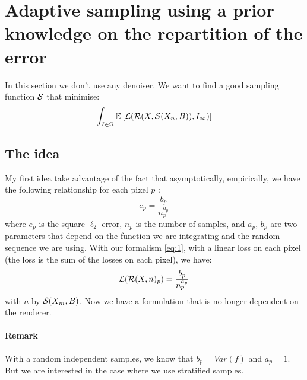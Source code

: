 \documentclass{classeENS}
\begin{document}
\section{Adaptive sampling using a prior knowledge on the repartition of the error}

In this section we don't use any denoiser.
We want to find a good sampling function $\mathcal S$ that minimise:
\[ \int_{I\in\Omega} \mathbb E \left [ \mathcal L (\mathcal R(X, \mathcal S(X_n, B)), I_\infty) \right ] \]

\subsection{The idea}

My first idea take advantage of the fact that asymptotically, empirically, we have 
the following relationship for each pixel $p$ \cite{10.1145/237170.237265}:
\begin{equation}
    \label{eq:99}
    e_p = \frac{b_p}{n_p^{a_p}}
\end{equation}
where $e_p$ is the square $\ell_2$ error, $n_p$ is the number of samples, 
and $a_p$, $b_p$ are two parameters that depend on the function we are 
integrating and the random sequence we are using. With our formalism 
\ref{eq:1}, with a linear loss on each pixel (the loss is the sum of 
the losses on each pixel), we have:
\[ \mathcal L(\mathcal R(X,n)_p) = \frac{b_p}{n_p^{a_p}} \]
with $n$ by $\mathcal S(X_m, B)$. Now we have a formulation that is no longer 
dependent on the renderer.

\paragraph*{Remark} With a random independent samples, we know that $b_p = Var(f)$ and 
$a_p=1$. But we are interested in the case where we use stratified samples.
\end{document}
